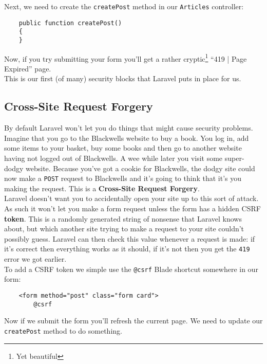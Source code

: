 Next, we need to create the \texttt{createPost} method in our \texttt{Articles} controller:

\begin{verbatim}
    public function createPost()
    {
    }
\end{verbatim}

Now, if you try submitting your form you'll get a rather cryptic\footnote{Yet beautiful} ``419 | Page Expired'' page.
\\

This is our first (of many) security blocks that Laravel puts in place for us.

\subsection{Cross-Site Request Forgery}

By default Laravel won't let you do things that might cause security problems.
\\

Imagine that you go to the Blackwells website to buy a book. You log in, add some items to your basket, buy some books and then go to another website having not logged out of Blackwells. A wee while later you visit some super-dodgy website. Because you've got a cookie for Blackwells, the dodgy site could now make a \texttt{POST} request to Blackwells and it's going to think that it's you making the request. This is a \textbf{Cross-Site Request Forgery}.
\\

Laravel doesn't want you to accidentally open your site up to this sort of attack. As such it won't let you make a form request unless the form has a hidden CSRF \textbf{token}. This is a randomly generated string of nonsense that Laravel knows about, but which another site trying to make a request to your site couldn't possibly guess. Laravel can then check this value whenever a request is made: if it's correct then everything works as it should, if it's not then you get the \texttt{419} error we got earlier.
\\

To add a CSRF token we simple use the \texttt{@csrf} Blade shortcut somewhere in our form:

\begin{verbatim}
    <form method="post" class="form card">
        @csrf
\end{verbatim}

Now if we submit the form you'll refresh the current page. We need to update our \texttt{createPost} method to do something.


